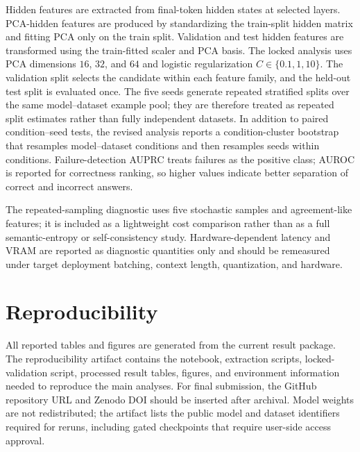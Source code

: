 \documentclass[preprint,12pt,authoryear]{elsarticle}
\begin{document}
Hidden features are extracted from final-token hidden states at selected layers. PCA-hidden features are produced by standardizing the train-split hidden matrix and fitting PCA only on the train split. Validation and test hidden features are transformed using the train-fitted scaler and PCA basis. The locked analysis uses PCA dimensions $16$, $32$, and $64$ and logistic regularization $C\in\{0.1,1,10\}$. The validation split selects the candidate within each feature family, and the held-out test split is evaluated once. The five seeds generate repeated stratified splits over the same model--dataset example pool; they are therefore treated as repeated split estimates rather than fully independent datasets. In addition to paired condition--seed tests, the revised analysis reports a condition-cluster bootstrap that resamples model--dataset conditions and then resamples seeds within conditions. Failure-detection AUPRC treats failures as the positive class; AUROC is reported for correctness ranking, so higher values indicate better separation of correct and incorrect answers.

The repeated-sampling diagnostic uses five stochastic samples and agreement-like features; it is included as a lightweight cost comparison rather than as a full semantic-entropy or self-consistency study. Hardware-dependent latency and VRAM are reported as diagnostic quantities only and should be remeasured under target deployment batching, context length, quantization, and hardware.

\section{Reproducibility}

All reported tables and figures are generated from the current result package. The reproducibility artifact contains the notebook, extraction scripts, locked-validation script, processed result tables, figures, and environment information needed to reproduce the main analyses. For final submission, the GitHub repository URL and Zenodo DOI should be inserted after archival. Model weights are not redistributed; the artifact lists the public model and dataset identifiers required for reruns, including gated checkpoints that require user-side access approval.
\end{document}
